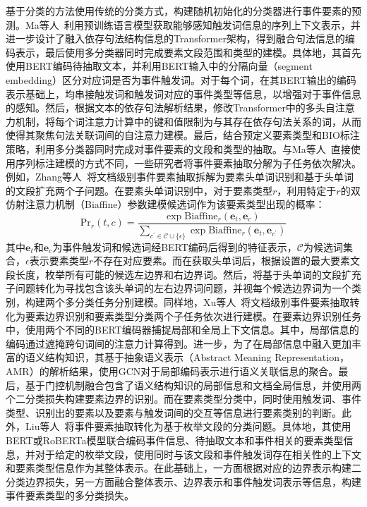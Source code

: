 基于分类的方法使用传统的分类方式，构建随机初始化的分类器进行事件要素的预测。Ma等人~\cite{ma2020resource}利用预训练语言模型获取能够感知触发词信息的序列上下文表示，并进一步设计了融入依存句法结构信息的Transformer架构，得到融合句法信息的编码表示，最后使用多分类器同时完成要素文段范围和类型的建模。具体地，其首先使用BERT编码待抽取文本，并利用BERT输入中的分隔向量（segment embedding）区分对应词是否为事件触发词。对于每个词，在其BERT输出的编码表示基础上，均串接触发词和触发词对应的事件类型等信息，以增强对于事件信息的感知。然后，根据文本的依存句法解析结果，修改Transformer中的多头自注意力机制，将每个词注意力计算中的键和值限制为与其存在依存句法关系的词，从而使得其聚焦句法关联词间的自注意力建模。最后，结合预定义要素类型和BIO标注策略，利用多分类器同时完成对事件要素的文段和类型的抽取。与Ma等人~\cite{ma2020resource}直接使用序列标注建模的方式不同，一些研究者将事件要素抽取分解为子任务依次解决。例如，Zhang等人~\cite{zhang2020two}将文档级别事件要素抽取拆解为要素头单词识别和基于头单词的文段扩充两个子问题。在要素头单词识别中，对于要素类型$r$，利用特定于$r$的双仿射注意力机制（Biaffine）\cite{dozat2018simpler}参数建模候选词作为该要素类型出现的概率：
\begin{equation}
    \textrm{Pr}_r(t, c)=\frac{\exp \textrm{Biaffine}_r\left(\boldsymbol{e}_t, \boldsymbol{e}_c\right)}{\sum_{c^{\prime} \in \mathcal{C} \cup\{\epsilon\}} \exp \textrm{Biaffine}_r\left(\boldsymbol{e}_t, \boldsymbol{e}_{c^{\prime}}\right)}
\end{equation}
其中$\boldsymbol{e}_t$和$\boldsymbol{e}_c$为事件触发词和候选词经BERT编码后得到的特征表示，$\mathcal{C}$为候选词集合，$\epsilon$表示要素类型$r$不存在对应要素。而在获取头单词后，根据设置的最大要素文段长度，枚举所有可能的候选左边界和右边界词。然后，将基于头单词的文段扩充子问题转化为寻找包含该头单词的左右边界词问题，并视每个候选边界词为一个类别，构建两个多分类任务分别建模。同样地，Xu等人~\cite{xu2022two}将文档级别事件要素抽取转化为要素边界识别和要素类型分类两个子任务依次进行建模。在要素边界识别任务中，使用两个不同的BERT编码器捕捉局部和全局上下文信息。其中，局部信息的编码通过遮掩跨句词间的注意力计算得到。进一步，为了在局部信息中融入更加丰富的语义结构知识，其基于抽象语义表示（Abstract Meaning Representation，AMR）\cite{banarescu2013abstract}的解析结果，使用GCN对于局部编码表示进行语义关联信息的聚合。最后，基于门控机制融合包含了语义结构知识的局部信息和文档全局信息，并使用两个二分类损失构建要素边界的识别。而在要素类型分类中，同时使用触发词、事件类型、识别出的要素以及要素与触发词间的交互等信息进行要素类别的判断。此外，Liu等人~\cite{liu2023enhancing}将事件要素抽取转化为基于枚举文段的分类问题。具体地，其使用BERT或RoBERTa模型联合编码事件信息、待抽取文本和事件相关的要素类型信息，并对于给定的枚举文段，使用同时与该文段和事件触发词存在相关性的上下文和要素类型信息作为其整体表示。在此基础上，一方面根据对应的边界表示构建二分类边界损失，另一方面融合整体表示、边界表示和事件触发词表示等信息，构建事件要素类型的多分类损失。

